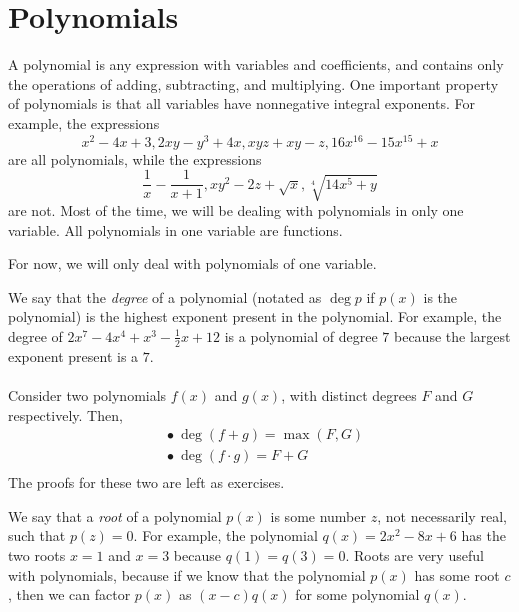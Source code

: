 \documentclass[12pt]{article}
\begin{document}
\newpage
\section{Polynomials}
\begin{tcolorbox}[colback=red!10!white, colframe=red!50!black, title=Definition of Polynomial]
    A polynomial is any expression with variables and coefficients, and contains only the operations of adding, subtracting, and multiplying. One important property of polynomials is that all variables have nonnegative integral exponents. For example, the expressions 
    \[
        x^2-4x+3, 2xy-y^3+4x, xyz+xy-z, 16x^{16}-15x^{15}+x
    \]
    are all polynomials, while the expressions 
    \[
        \frac{1}{x}-\frac{1}{x+1},xy^2-2z+\sqrt{x}, \sqrt[4]{14x^5+y}
    \]
    are not. Most of the time, we will be dealing with polynomials in only one variable. All polynomials in one variable are functions.
\end{tcolorbox}
For now, we will only deal with polynomials of one variable.
\begin{tcolorbox}[colback=red!10!white, colframe=red!50!black, title=Definition of Degree]
    We say that the \textit{degree} of a polynomial (notated as $\deg p$ if $p(x)$ is the polynomial) is the highest exponent present in the polynomial. For example, the degree of $2x^7-4x^4+x^3-\frac{1}{2}x+12$ is a polynomial of degree $7$ because the largest exponent present is a $7$. \\\\
    Consider two polynomials $f(x)$ and $g(x)$, with distinct degrees $F$ and $G$ respectively. Then, 
    \begin{align*}
        &\bullet\ \deg(f+g)=\max(F,G)\\
        &\bullet\ \deg(f\cdot g)=F+G\\
    \end{align*}
    The proofs for these two are left as exercises. 
\end{tcolorbox}
\begin{tcolorbox}[colback=red!10!white, colframe=red!50!black, title=Definition of Root]
    We say that a \textit{root} of a polynomial $p(x)$ is some number $z$, not necessarily real, such that $p(z)=0$. For example, the polynomial $q(x)=2x^2-8x+6$ has the two roots $x=1$ and $x=3$ because $q(1)=q(3)=0$. Roots are very useful with polynomials, because if we know that the polynomial $p(x)$ has some root $c$, then we can factor $p(x)$ as $(x-c)q(x)$ for some polynomial $q(x)$.
\end{tcolorbox}
\end{document}
